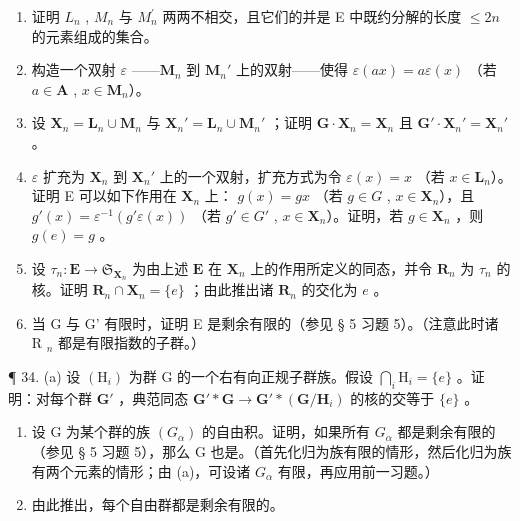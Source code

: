 \begin{enumerate}
\def\labelenumi{(\alph{enumi})}
\item
  证明 \(L_{n}\) , \(M_{n}\) 与 \(M_{n}^{\prime}\) 两两不相交，且它们的并是 E 中既约分解的长度 \(\leqslant2n\) 的元素组成的集合。
\item
  构造一个双射 \(\varepsilon\) ——\(\mathbf{M}_n\) 到 \(\mathbf{M}_n'\) 上的双射——使得 \(\varepsilon(ax) = a\varepsilon(x)\) （若 \(a \in \mathbf{A}\) , \(x \in \mathbf{M}_n\)）。
\item
  设 \(\mathbf{X}_n = \mathbf{L}_n \cup \mathbf{M}_n\) 与 \(\mathbf{X}_n' = \mathbf{L}_n \cup \mathbf{M}_n'\) ；证明 \(\mathbf{G} \cdot \mathbf{X}_n = \mathbf{X}_n\) 且 \(\mathbf{G}' \cdot \mathbf{X}_n' = \mathbf{X}_n'\) 。
\item
  \(\varepsilon\) 扩充为 \(\mathbf{X}_n\) 到 \(\mathbf{X}_n'\) 上的一个双射，扩充方式为令 \(\varepsilon(x) = x\) （若 \(x \in \mathbf{L}_n\)）。证明 E 可以如下作用在 \(\mathbf{X}_n\) 上： \(g(x) = gx\) （若 \(g \in G\) , \(x \in \mathbf{X}_n\)），且 \(g'(x) = \varepsilon^{-1}(g' \varepsilon (x))\) （若 \(g' \in G'\) , \(x \in \mathbf{X}_n\)）。证明，若 \(g \in \mathbf{X}_n\) ，则 \(g(e) = g\) 。
\item
  设 \(\tau_{n}\colon\mathbf{E}\to\mathfrak{S}_{\mathbf{X}_{n}}\) 为由上述 \(\mathbf{E}\) 在 \(\mathbf{X}_{n}\) 上的作用所定义的同态，并令 \(\mathbf{R}_{n}\) 为 \(\tau_{n}\) 的核。证明 \(\mathbf{R}_{n}\cap\mathbf{X}_{n}=\{e\}\) ；由此推出诸 \(\mathbf{R}_{n}\) 的交化为 \(e\) 。
\item
  当 G 与 G' 有限时，证明 E 是剩余有限的（参见 § 5 习题 5）。（注意此时诸 R \(_{n}\) 都是有限指数的子群。）
\end{enumerate}

¶ 34. (a) 设 \((\mathrm{H}_{i})\) 为群 G 的一个右有向正规子群族。假设 \(\bigcap_{i} \mathrm{H}_{i} = \{e\}\) 。证明：对每个群 \(\mathbf{G}'\) ，典范同态 \(\mathbf{G}' * \mathbf{G} \to \mathbf{G}' * (\mathbf{G}/\mathbf{H}_{i})\) 的核的交等于 \(\{e\}\) 。

\begin{enumerate}
\def\labelenumi{(\alph{enumi})}
\setcounter{enumi}{1}
\item
  设 G 为某个群的族 \((G_{\alpha})\) 的自由积。证明，如果所有 \(G_{\alpha}\) 都是剩余有限的（参见 § 5 习题 5），那么 G 也是。（首先化归为族有限的情形，然后化归为族有两个元素的情形；由 (a)，可设诸 \(G_{\alpha}\) 有限，再应用前一习题。）
\item
  由此推出，每个自由群都是剩余有限的。
\end{enumerate}

